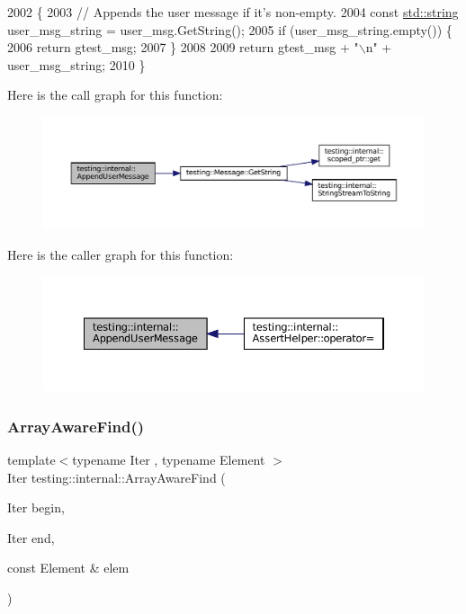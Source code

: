 \begin{DoxyCode}
2002                                                        \{
2003   \textcolor{comment}{// Appends the user message if it's non-empty.}
2004   \textcolor{keyword}{const} \hyperlink{namespacetesting_1_1internal_a8e8ff5b11e64078831112677156cb111}{std::string} user\_msg\_string = user\_msg.GetString();
2005   \textcolor{keywordflow}{if} (user\_msg\_string.empty()) \{
2006     \textcolor{keywordflow}{return} gtest\_msg;
2007   \}
2008 
2009   \textcolor{keywordflow}{return} gtest\_msg + \textcolor{stringliteral}{"\(\backslash\)n"} + user\_msg\_string;
2010 \}
\end{DoxyCode}
Here is the call graph for this function\+:
\nopagebreak
\begin{figure}[H]
\begin{center}
\leavevmode
\includegraphics[width=350pt]{namespacetesting_1_1internal_ae475a090bca903bb222dd389eb189166_cgraph}
\end{center}
\end{figure}
Here is the caller graph for this function\+:
\nopagebreak
\begin{figure}[H]
\begin{center}
\leavevmode
\includegraphics[width=350pt]{namespacetesting_1_1internal_ae475a090bca903bb222dd389eb189166_icgraph}
\end{center}
\end{figure}
\mbox{\label{namespacetesting_1_1internal_a94a857fe6ff32cf4fdc4769a4071f239}} 
\subsubsection{\texorpdfstring{Array\+Aware\+Find()}{ArrayAwareFind()}}
{\footnotesize\ttfamily template$<$typename Iter , typename Element $>$ \\
Iter testing\+::internal\+::\+Array\+Aware\+Find (\begin{DoxyParamCaption}\item[{Iter}]{begin,  }\item[{Iter}]{end,  }\item[{const Element \&}]{elem }\end{DoxyParamCaption})}



